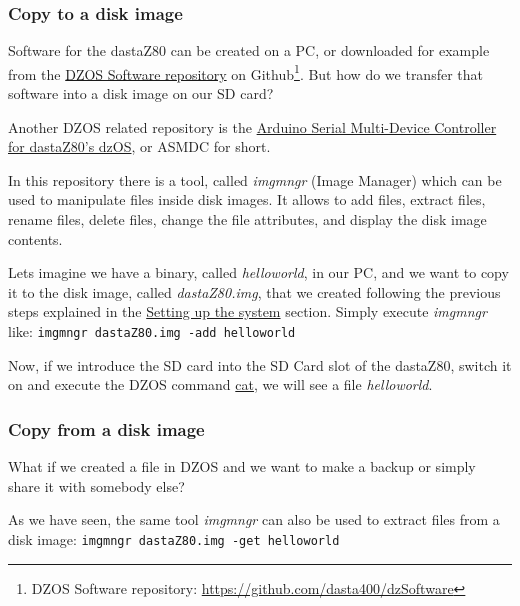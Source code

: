 \documentclass[a4paper,11pt]{article}
\begin{document}
    \subsubsection{Copy to a disk image}

    Software for the dastaZ80 can be created on a PC, or downloaded for example
    from the \href{https://github.com/dasta400/dzSoftware}{DZOS Software repository}
    on Github\footnote{DZOS Software repository: 
    \url{https://github.com/dasta400/dzSoftware}}. But how do we transfer that
    software into a disk image on our SD card?

    Another DZOS related repository is the \href{https://github.com/dasta400/asmdc}
    {Arduino Serial Multi-Device Controller for dastaZ80's dzOS}, or ASMDC for
    short.

    In this repository there is a tool, called \textit{imgmngr} (Image Manager)
    which can be used to manipulate files inside disk images. It allows to add
    files, extract files, rename files, delete files, change the file attributes,
    and display the disk image contents.

    Lets imagine we have a binary, called \textit{helloworld}, in our PC, and we
    want to copy it to the disk image, called \textit{dastaZ80.img}, that we
    created following the previous steps explained in the
    \hyperref[sec:setting_system]{Setting up the system} section. Simply execute
    \textit{imgmngr} like: \texttt{imgmngr dastaZ80.img -add helloworld}

    Now, if we introduce the SD card into the SD Card slot of the dastaZ80,
    switch it on and execute the DZOS command \hyperref[cmd:cat]{cat}, we will
    see a file \textit{helloworld}.

    \subsubsection{Copy from a disk image}

    What if we created a file in DZOS and we want to make a backup or simply
    share it with somebody else?

    As we have seen, the same tool \textit{imgmngr} can also be used to extract
    files from a disk image: \texttt{imgmngr dastaZ80.img -get helloworld}
\end{document}
